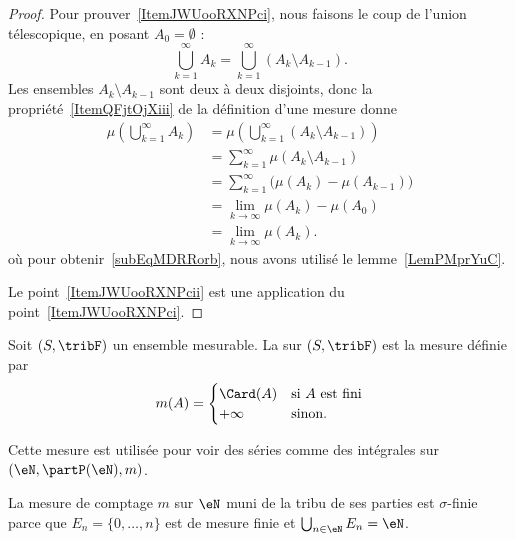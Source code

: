 \begin{proof}
    Pour prouver~\ref{ItemJWUooRXNPci}, nous faisons le coup de l'union télescopique, en posant \( A_0=\emptyset\) :
    \begin{equation}
        \bigcup_{k=1}^{\infty}A_k=\bigcup_{k=1}^{\infty}(A_k\setminus A_{k-1}).
    \end{equation}
    Les ensembles \( A_k\setminus A_{k-1}\) sont deux à deux disjoints, donc la propriété~\ref{ItemQFjtOjXiii} de la définition d'une mesure donne
    \begin{subequations}
        \begin{align}
            \mu(\bigcup_{k=1}^{\infty}A_k)&=\mu\left( \bigcup_{k=1}^{\infty}(A_k\setminus A_{k-1}) \right)\\
            &=\sum_{k=1}^{\infty}\mu(A_k\setminus A_{k-1})\\
            &=   \sum_{k=1}^{\infty}\big( \mu(A_k)-\mu(A_{k-1}) \big)    \label{subEqMDRRorb}\\
            &=\lim_{k\to \infty} \mu(A_k)-\mu(A_0)\\
            &=\lim_{k\to \infty} \mu(A_k).
        \end{align}
    \end{subequations}
    où pour obtenir~\ref{subEqMDRRorb}, nous avons utilisé le lemme~\ref{LemPMprYuC}.

    Le point~\ref{ItemJWUooRXNPcii} est une application du point~\ref{ItemJWUooRXNPci}.
\end{proof}

\begin{definition}      \label{DEFooILJRooByDzhs}
    Soit \( (S,\tribF)\) un ensemble mesurable. La  sur \( (S,\tribF)\) est la mesure définie par
    \begin{equation}
        m(A)=\begin{cases}
            \Card(A)    &   \text{si } A\text{ est fini}\\
            +\infty    &    \text{sinon}.
        \end{cases}
    \end{equation}
\end{definition}
Cette mesure est utilisée pour voir des séries comme des intégrales sur \( (\eN,\partP(\eN),m)\).

\begin{example}
    La mesure de comptage \( m\) sur \( \eN\) muni de la tribu de ses parties est \( \sigma\)-finie parce que \( E_n=\{ 0,\ldots, n \}\) est de mesure finie et \( \bigcup_{n\in \eN}E_n=\eN\).
\end{example}

